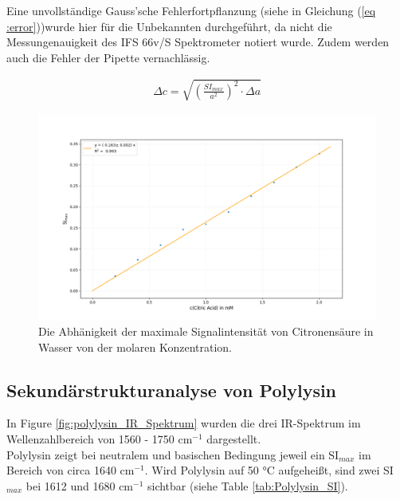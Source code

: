 \documentclass[10pt,a4paper]{article}
\begin{document}
			Eine unvollständige Gauss'sche Fehlerfortpflanzung (siehe in Gleichung (\ref{eq :error}))wurde hier für die Unbekannten durchgeführt, da nicht die Messungenauigkeit des IFS 66v/S Spektrometer notiert wurde. Zudem werden auch die Fehler der Pipette vernachlässig.
			
			\begin{equation}\label{eq :error}
				\begin{split}
					\Delta c = \sqrt{\left( \frac{SI_{max}}{a^2}\right)^2 \cdot \Delta a}
				\end{split}
			\end{equation}
			
		\begin{figure}[H]
			\centering
			\includegraphics[scale=0.55]{Standardcurve_Fit.png}
			\caption{Die Abhänigkeit der maximale Signalintensität von Citronensäure in Wasser von der molaren Konzentration. }
			\label{fig:Standardcurve}
		\end{figure}
		

		\subsection{Sekundärstrukturanalyse von Polylysin}
		
			In Figure \ref{fig:polylysin_IR_Spektrum} wurden die drei IR-Spektrum im Wellenzahlbereich von 1560 - 1750 cm$^{-1}$ dargestellt.\\
			Polylysin zeigt bei neutralem und basischen Bedingung jeweil ein SI$_{max}$ im Bereich von circa 1640 cm$^{-1}$. Wird Polylysin auf 50 °C aufgeheißt, sind zwei SI$_{max}$ bei 1612 und 1680 cm$^{-1}$ sichtbar (siehe Table \ref{tab:Polylysin_SI}).
				
\end{document}
